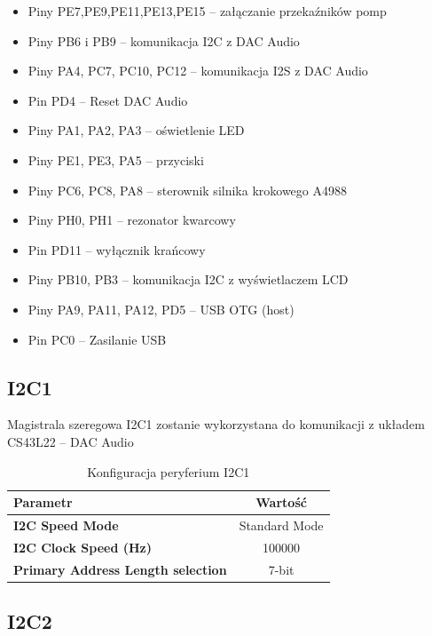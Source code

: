 \documentclass[10pt, a4paper]{article}
\begin{document}
\begin{itemize}
\item Piny PE7,PE9,PE11,PE13,PE15 -- załączanie przekaźników pomp
\item Piny PB6 i PB9 -- komunikacja I2C z DAC Audio
\item Piny PA4, PC7, PC10, PC12 -- komunikacja I2S z DAC Audio
\item Pin PD4 -- Reset DAC Audio
\item Piny PA1, PA2, PA3 -- oświetlenie LED
\item Piny PE1, PE3, PA5 -- przyciski
\item Piny PC6, PC8, PA8 -- sterownik silnika krokowego A4988
\item Piny PH0, PH1 -- rezonator kwarcowy
\item Pin PD11 -- wyłącznik krańcowy
\item Piny PB10, PB3 -- komunikacja I2C z wyświetlaczem LCD
\item Piny PA9, PA11, PA12, PD5 -- USB OTG (host)
\item Pin PC0 -- Zasilanie USB
\end{itemize}



\subsection{I2C1}

Magistrala szeregowa I2C1 zostanie wykorzystana do komunikacji z układem CS43L22 -- DAC Audio

\begin{table}[H]
	\centering
	\begin{tabular}{|l|c|} \hline
		\textbf{Parametr} & Wartość \\
		\hline
		\hline  \textbf{I2C Speed Mode}& Standard Mode \\  \hline
		\textbf{I2C Clock Speed (Hz) } & 100000 \\
		
		\hline  \textbf{Primary Address Length selection}& 7-bit  \\\hline

	\end{tabular}
	\caption{Konfiguracja peryferium I2C1}
	\label{tab:USART}
\end{table}
\subsection{I2C2}
\end{document}
